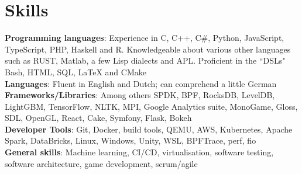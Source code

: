 \documentclass[letterpaper,11pt]{article}
\begin{document}
%
\section{Skills}
 \begin{itemize}[leftmargin=0.15in, label={}]
    \small{\item{
     \textbf{Programming languages}{: Experience in C, C++, C\#, Python, JavaScript, TypeScript, PHP, Haskell and R. Knowledgeable about various other languages such as RUST, Matlab, a few Lisp dialects and APL. Proficient in the ``DSLs" Bash, HTML, SQL, LaTeX and CMake} \\
     \textbf{Languages}{: Fluent in English and Dutch; can comprehend a little German} \\
     \textbf{Frameworks/Libraries}{: Among others SPDK, BPF, RocksDB, LevelDB, LightGBM, TensorFlow, NLTK, MPI, Google Analytics suite, MonoGame, Gloss, SDL, OpenGL,  React, Cake, Symfony, Flask, Bokeh} \\
     \textbf{Developer Tools}{: Git, Docker, build tools, QEMU, AWS, Kubernetes, Apache Spark, DataBricks, Linux, Windows, Unity, WSL,  BPFTrace, perf, fio} \\
     \textbf{General skills}{: Machine learning, CI/CD, virtualisation, software testing, software architecture, game development, scrum/agile }
     }} 
 \end{itemize}


\end{document}
